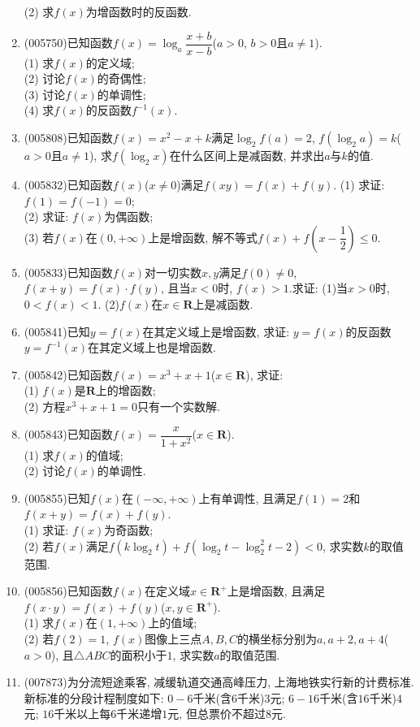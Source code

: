\documentclass[10pt,a4paper]{article}
\begin{document}
\begin{enumerate}[1.]
(2) 求$f(x)$为增函数时的反函数.
\item {\tiny (005750)}已知函数$f(x)=\log_a\dfrac{x+b}{x-b}$($a>0$, $b>0$且$a\ne 1$).\\
(1) 求$f(x)$的定义域;\\
(2) 讨论$f(x)$的奇偶性;\\
(3) 讨论$f(x)$的单调性;\\
(4) 求$f(x)$的反函数$f^{-1}(x)$.
\item {\tiny (005808)}已知函数$f(x)=x^2-x+k$满足$\log_2f(a)=2$, $f(\log_2a)=k$($a>0$且$a\ne 1$), 求$f(\log_2x)$在什么区间上是减函数, 并求出$a$与$k$的值.
\item {\tiny (005832)}已知函数$f(x)$($x\ne 0$)满足$f(xy)=f(x)+f(y)$.
(1) 求证: $f(1)=f(-1)=0$;\\
(2) 求证: $f(x)$为偶函数;\\
(3) 若$f(x)$在$(0,+\infty)$上是增函数, 解不等式$f(x)+f(x-\dfrac 12)\le 0$.
\item {\tiny (005833)}已知函数$f(x)$对一切实数$x,y$满足$f(0)\ne 0$, $f(x+y)=f(x)\cdot f(y)$, 且当$x<0$时, $f(x)>1$.求证:
(1)当$x>0$时, $0<f(x)<1$.
(2)$f(x)$在$x\in \mathbf{R}$上是减函数.
\item {\tiny (005841)}已知$y=f(x)$在其定义域上是增函数, 求证: $y=f(x)$的反函数$y=f^{-1}(x)$在其定义域上也是增函数.
\item {\tiny (005842)}已知函数$f(x)=x^3+x+1$($x\in \mathbf{R}$), 求证:\\
(1) $f(x)$是$\mathbf{R}$上的增函数;\\
(2) 方程$x^3+x+1=0$只有一个实数解.
\item {\tiny (005843)}已知函数$f(x)=\dfrac x{1+x^2}$($x\in \mathbf{R}$).\\
(1) 求$f(x)$的值域;\\
(2) 讨论$f(x)$的单调性.
\item {\tiny (005855)}已知$f(x)$在$(-\infty ,+\infty)$上有单调性, 且满足$f(1)=2$和$f(x+y)=f(x)+f(y)$.\\
(1) 求证: $f(x)$为奇函数;\\
(2) 若$f(x)$满足$f(k\log_2t)+f(\log_2t-\log_2^2t-2)<0$, 求实数$k$的取值范围.
\item {\tiny (005856)}已知函数$f(x)$在定义域$x\in \mathbf{R}^+$上是增函数, 且满足$f(x\cdot y)=f(x)+f(y)$($x,y\in \mathbf{R}^+$).\\
(1) 求$f(x)$在$(1,+\infty)$上的值域;\\
(2) 若$f(2)=1$, $f(x)$图像上三点$A,B,C$的横坐标分别为$a,a+2,a+4$($a>0$), 且$\triangle ABC$的面积小于$1$, 求实数$a$的取值范围.
\item {\tiny (007873)}为分流短途乘客, 减缓轨道交通高峰压力, 上海地铁实行新的计费标准. 新标准的分段计程制度如下: $0-6$千米(含$6$千米)$3$元; $6-16$千米(含$16$千米)$4$元; $16$千米以上每$6$千米递增$1$元, 但总票价不超过$8$元.\\

\end{enumerate}
\end{document}
